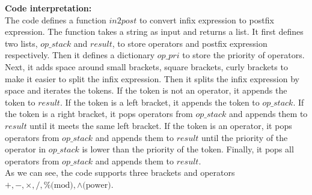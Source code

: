 \documentclass[UTF8]{ctexart}
\begin{document}
\textbf{Code interpretation:} \\
The code defines a function $in2post$ to convert infix expression to postfix expression. The function takes a string as input and returns a list.
It first defines two lists, $op\_stack$ and $result$, to store operators and postfix expression respectively. Then it defines a dictionary $op\_pri$ to store the priority of operators. 
Next, it adds space around small brackets, square brackets, curly brackets to make it easier to split the infix expression. Then it splits the infix expression by space and iterates the tokens. If the token is not an operator, it appends the token to $result$. 
If the token is a left bracket, it appends the token to $op\_stack$. If the token is a right bracket, it pops operators from $op\_stack$ and appends them to $result$ until it meets the same left bracket. If the token is an operator, it pops operators from $op\_stack$ 
and appends them to $result$ until the priority of the operator in $op\_stack$ is lower than the priority of the token. Finally, it pops all operators from $op\_stack$ and appends them to $result$.\\
As we can see, the code supports three brackets and operators $+, -, \times, /, \% \text{(mod)},\wedge \text{(power)} $.\\
\end{document}
